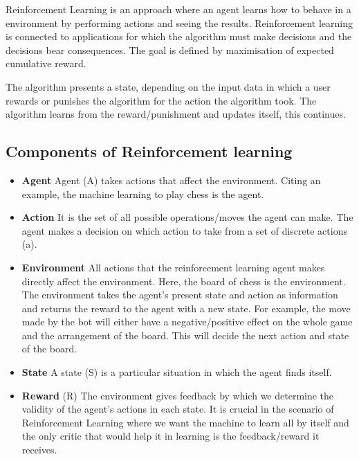 \documentclass{article}
\begin{document}
Reinforcement Learning is an approach where an agent learns how to behave in a environment by performing actions and seeing the results. Reinforcement learning is connected to applications for which the algorithm must make decisions and the decisions bear consequences. The goal is defined by maximisation of expected cumulative reward.

The algorithm presents a state, depending on the input data in which a user rewards or punishes the algorithm for the action the algorithm took. The algorithm learns from the reward/punishment and updates itself, this continues.

\subsection{Components of Reinforcement learning}
\begin{itemize}
\renewcommand\labelitemi{--}
\item \textbf{Agent}  Agent (A) takes actions that affect the environment. Citing an example, the machine learning to play chess is the agent.
\item \textbf{Action} It is the set of all possible operations/moves the agent can make. The agent makes a decision on which action to take from a set of discrete actions (a).
\item \textbf{Environment} All actions that the reinforcement learning agent makes directly affect the environment. Here, the board of chess is the environment. The environment takes the agent's present state and action as information and returns the reward to the agent with a new state.
For example, the move made by the bot will either have a negative/positive effect on the whole game and the arrangement of the board. This will decide the next action and state of the board.
\item \textbf{State} A state (S) is a particular situation in which the agent finds itself.
\item \textbf{Reward} (R) The environment gives feedback by which we determine the validity of the agent’s actions in each state. It is crucial in the scenario of Reinforcement Learning where we want the machine to learn all by itself and the only critic that would help it in learning is the feedback/reward it receives.


\end{itemize}
\end{document}
